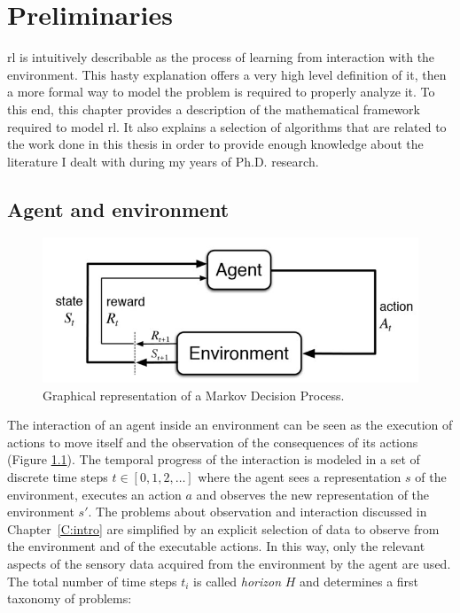 \chapter{Preliminaries}\label{C:soa}
\gls{rl} is intuitively describable as the process of learning from interaction with the environment. This hasty explanation offers a very high level definition of it, then a more formal way to model the problem is required to properly analyze it. To this end, this chapter provides a description of the mathematical framework required to model \gls{rl}. It also explains a selection of algorithms that are related to the work done in this thesis in order to provide enough knowledge about the literature I dealt with during my years of Ph.D. research.

\section{Agent and environment}
\begin{figure}[b]
\begin{minipage}{\textwidth}
\begin{center}
  \includegraphics[scale=.75]{img/mdp1.jpg}
\end{center}
\end{minipage}
\caption[Markov Decision Process scheme]{Graphical representation of a Markov Decision Process.}\label{F:mdp1}
\end{figure}
The interaction of an agent inside an environment can be seen as the execution of actions to move itself and the observation of the consequences of its actions (Figure \ref{F:mdp1}). The temporal progress of the interaction is modeled in a set of discrete time steps $t \in [0, 1, 2, \dots]$ where the agent sees a representation $s$ of the environment, executes an action $a$ and observes the new representation of the environment $s'$. The problems about observation and interaction discussed in Chapter~\ref{C:intro} are simplified by an explicit selection of data to observe from the environment and of the executable actions. In this way, only the relevant aspects of the sensory data acquired from the environment by the agent are used. The total number of time steps $t_i$ is called \textit{horizon} $H$ and determines a first taxonomy of problems:
